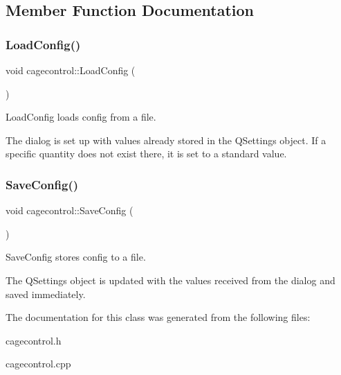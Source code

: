 \subsection{Member Function Documentation}
\mbox{\label{classcagecontrol_a0e6648cef5e6d08d638aa2472824cb6b}} 
\subsubsection{\texorpdfstring{Load\+Config()}{LoadConfig()}}
{\footnotesize\ttfamily void cagecontrol\+::\+Load\+Config (\begin{DoxyParamCaption}{ }\end{DoxyParamCaption})\hspace{0.3cm}{\ttfamily [private]}}



Load\+Config loads config from a file. 

The dialog is set up with values already stored in the Q\+Settings object. If a specific quantity does not exist there, it is set to a standard value. \mbox{\label{classcagecontrol_a217d948983c0d1c153d29c728b06d764}} 
\subsubsection{\texorpdfstring{Save\+Config()}{SaveConfig()}}
{\footnotesize\ttfamily void cagecontrol\+::\+Save\+Config (\begin{DoxyParamCaption}{ }\end{DoxyParamCaption})\hspace{0.3cm}{\ttfamily [private]}}



Save\+Config stores config to a file. 

The Q\+Settings object is updated with the values received from the dialog and saved immediately. 

The documentation for this class was generated from the following files\+:\begin{DoxyCompactItemize}
\item 
cagecontrol.\+h\item 
cagecontrol.\+cpp\end{DoxyCompactItemize}
